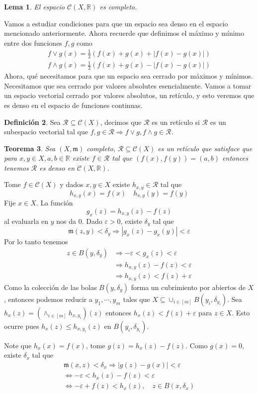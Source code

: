 \documentclass[12pt]{article}
\theoremstyle{plain}
\newtheorem{Th}{Teorema}[subsection]   %
\newtheorem{Lem}[Th]{Lema}             %
\theoremstyle{definition}
\newtheorem{Def}[Th]{Definición}       %
\theoremstyle{remark}
\numberwithin{equation}{section}
\newcommand{\bR}{\mathbb{R}}        %
\newcommand{\cC}{\mathcal{C}}       %
\newcommand{\mm}{\mathfrak{m}}      %
\newcommand{\cR}{\mathcal{R}}       %
\renewcommand{\leq}{\leqslant}      %
\renewcommand{\:}{\colon}           %
\newcommand{\bonj}[1]{\left\lbrack#1\right\rbrack}
\begin{document}
\begin{multicols}{2}
 \begin{Lem}
     El espacio $\cC(X,\bR)$ es completo.
 \end{Lem}

 Vamos a estudiar condiciones para que un espacio sea denso en el espacio mencionado anteriormente. Ahora recuerde que definimos el máximo y mínimo entre dos funciones $f,g$ como
 \begin{gather*}
   f\lor g(x)=\frac{1}{2}\left(f(x)+g(x)+|f(x)-g(x)|\right) \\
    f\land g(x)=\frac{1}{2}\left(f(x)+g(x)-|f(x)-g(x)|\right)
 \end{gather*}
Ahora, qué necesitamos para que un espacio sea cerrado por máximos y mínimos. Necesitamos que sea cerrado por valores absolutes esencialmente. Vamos a tomar un espacio vectorial cerrado por valores absolutos, un retículo, y esto veremos que es denso en el espacio de funciones continuas.

\begin{Def}
  Sea $\cR\subseteq\cC(X)$, decimos que $\cR$ es un retículo si $\cR$ es un subespacio vectorial tal que $f,g\in\cR\Rightarrow f\lor g, f\land g\in\cR$.
\end{Def}

\begin{Th}
  Sea $(X,\mm)$ completo, $\cR\subseteq\cC(X)$ es un retículo que satisface que para $x,y\in X, a,b\in\bR$ existe $f\in\cR$ tal que $(f(x),f(y))=(a,b)$ entonces tenemos $\cR$ es denso en $\cC(X,\bR)$.
\end{Th}
\begin{ptcbp}
Tome $f\in\cC(X)$ y dados $x,y\in X$ existe $h_{x,y}\in\cR$ tal que
$$h_{x,y}(x)=f(x)\quad h_{x,y}(y)=f(y)$$
Fije $x\in X$. La función
$$g_x(z)=h_{x,y}(z)-f(z)$$
al evaluarla en $y$ nos da $0$. Dado $\varepsilon>0$, existe $\delta_y$ tal que
$$\mm(z,y)<\delta_y\Rightarrow|g_x(z)-g_x(y)|<\varepsilon$$
Por lo tanto tenemos
\begin{align*}
  z\in B(y,\delta_y) &\Rightarrow -\varepsilon<g_x(z)<\varepsilon \\
   &\Rightarrow h_{x,y}(z)-f(z)<\varepsilon \\
   &\Rightarrow h_{x,y}(z)<f(z)+\varepsilon
\end{align*}
Como la colección de las bolas $B(y,\delta_y)$ forma un cubrimiento por abiertos de $X$, entonces podemos reducir a $y_1,\cdots,y_m$ tales que $X\subseteq\cup_{i\in\bonj{m}}B(y_i,\delta_{y_i})$. Sea $h_x(z)=(\land_{i\in\bonj{m}}h_{x,y_i})(z)$ entonces $h_x(z)<f(z)+\varepsilon$ para $z\in X$. Esto ocurre pues $h_x(z)\leq h_{x,y_i}(z)$ en $B(y_i,\delta_{y_i})$. \par
Note que $h_x(x)=f(x)$, tome $g(z)=h_x(z)-f(z)$. Como $g(x)=0$, existe $\delta_x$ tal que
\begin{gather*}
  \mm(x,z)<\delta_x\Rightarrow |g(z)-g(x)|<\varepsilon \\
  \iff -\varepsilon<h_x(z)-f(z)<\varepsilon \\
  \iff -\varepsilon+f(z)<h_x(z),\quad z\in B(x,\delta_x)
\end{gather*}


\end{ptcbp}
\end{multicols}
\end{document}
